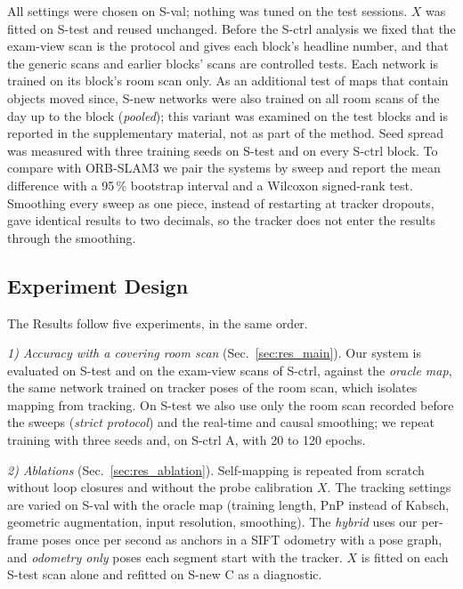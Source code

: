 \documentclass[9pt,shortpaper,twoside,web]{ieeecolor2}
\newcommand{\Sval}{S-val}
\newcommand{\Stest}{S-test}
\newcommand{\Snew}{S-new}
\newcommand{\Sctrl}{S-ctrl}
\begin{document}
All settings were chosen on \Sval{}; nothing was tuned on the test sessions. $X$ was fitted on \Stest{} and reused unchanged. Before the \Sctrl{} analysis we fixed that the exam-view scan is the protocol and gives each block's headline number, and that the generic scans and earlier blocks' scans are controlled tests. Each network is trained on its block's room scan only. As an additional test of maps that contain objects moved since, \Snew{} networks were also trained on all room scans of the day up to the block (\emph{pooled}); this variant was examined on the test blocks and is reported in the supplementary material, not as part of the method. Seed spread was measured with three training seeds on \Stest{} and on every \Sctrl{} block. To compare with ORB-SLAM3 we pair the systems by sweep and report the mean difference with a 95\,\% bootstrap interval and a Wilcoxon signed-rank test. Smoothing every sweep as one piece, instead of restarting at tracker dropouts, gave identical results to two decimals, so the tracker does not enter the results through the smoothing.

\subsection{Experiment Design}
\label{sec:baselines}\label{sec:ablations}\label{sec:occlusion}
The Results follow five experiments, in the same order.

\emph{1) Accuracy with a covering room scan} (Sec.~\ref{sec:res_main}). Our system is evaluated on \Stest{} and on the exam-view scans of \Sctrl{}, against the \emph{oracle map}, the same network trained on tracker poses of the room scan, which isolates mapping from tracking. On \Stest{} we also use only the room scan recorded before the sweeps (\emph{strict protocol}) and the real-time and causal smoothing; we repeat training with three seeds and, on \Sctrl{} A, with 20 to 120 epochs.

\emph{2) Ablations} (Sec.~\ref{sec:res_ablation}). Self-mapping is repeated from scratch without loop closures and without the probe calibration $X$. The tracking settings are varied on \Sval{} with the oracle map (training length, PnP instead of Kabsch, geometric augmentation, input resolution, smoothing). The \emph{hybrid} uses our per-frame poses once per second as anchors in a SIFT odometry with a pose graph, and \emph{odometry only} poses each segment start with the tracker. $X$ is fitted on each \Stest{} scan alone and refitted on \Snew{} C as a diagnostic.
\end{document}

